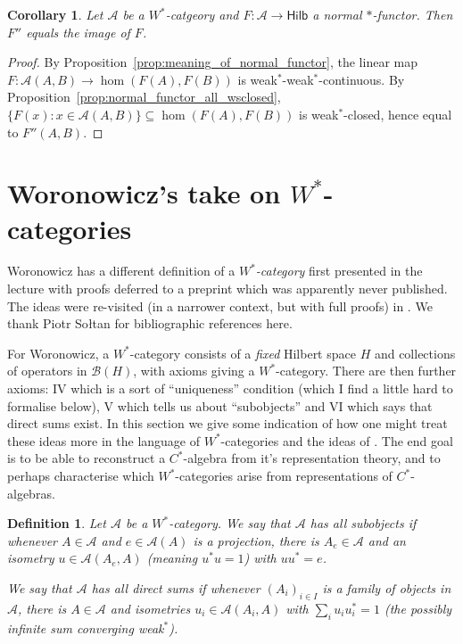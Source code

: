 \documentclass[a4paper,11pt]{article}
\theoremstyle{plain}
\newtheorem{corollary}[proposition]{Corollary}
\newtheorem{definition}[proposition]{Definition}
\theoremstyle{remark}
\newcommand{\mc}[1]{\mathcal{#1}}
\newcommand{\catHilb}{\textsf{Hilb}}
\begin{document}
\begin{corollary}\label{corr:normal_functor_equals_bicomm}
Let $\mc A$ be a $W^*$-catgeory and $F \colon \mc A \to \catHilb$ a normal $*$-functor.  Then $F''$ equals the image of $F$.
\end{corollary}
\begin{proof}
By Proposition~\ref{prop:meaning_of_normal_functor}, the linear map $F\colon \mc A(A,B) \to \hom(F(A), F(B))$ is weak$^*$-weak$^*$-continuous.  By Proposition~\ref{prop:normal_functor_all_wsclosed}, $\{ F(x) : x\in\mc A(A,B) \} \subseteq \hom(F(A), F(B))$ is weak$^*$-closed, hence equal to $F''(A,B)$.
\end{proof}




\section{Woronowicz's take on \texorpdfstring{$W^*$}{WStar}-categories}

Woronowicz has a different definition of a \emph{$W^*$-category} first presented in the lecture \cite{Woronowicz_DualityCStar} with proofs deferred to a preprint which was apparently never published.  The ideas were re-visited (in a narrower context, but with full proofs) in \cite[Section~5]{Woronowicz_GenUnbounded}.  We thank Piotr So{\l}tan for bibliographic references here.

For Woronowicz, a $W^*$-category consists of a \emph{fixed} Hilbert space $H$ and collections of operators in $\mc B(H)$, with axioms giving a $W^*$-category.  There are then further axioms: IV which is a sort of ``uniqueness'' condition (which I find a little hard to formalise below), V which tells us about ``subobjects'' and VI which says that direct sums exist.  In this section we give some indication of how one might treat these ideas more in the language of $W^*$-categories and the ideas of \cite{GLR_Wstar_categories}.  The end goal is to be able to reconstruct a $C^*$-algebra from it's representation theory, and to perhaps characterise which $W^*$-categories arise from representations of $C^*$-algebras.

\begin{definition}\label{defn:subobj_sums}
Let $\mc A$ be a $W^*$-category.  We say that $\mc A$ has \emph{all subobjects} if whenever $A\in\mc A$ and $e\in \mc A(A)$ is a projection, there is $A_e \in \mc A$ and an isometry $u\in\mc A(A_e, A)$ (meaning $u^*u=1$) with $uu^* = e$.

We say that $\mc A$ has \emph{all direct sums} if whenever $(A_i)_{i\in I}$ is a family of objects in $\mc A$, there is $A\in\mc A$ and isometries $u_i \in \mc A(A_i, A)$ with $\sum_i u_i u_i^* = 1$ (the possibly infinite sum converging weak$^*$).
\end{definition}
\end{document}
